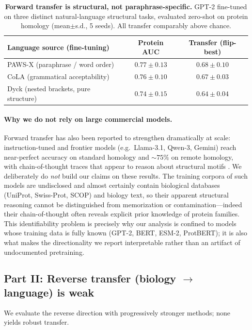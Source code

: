 \documentclass[11pt]{article}
\begin{document}
\begin{table}[t]
\centering
\caption{\textbf{Forward transfer is structural, not paraphrase-specific.} GPT-2 fine-tuned on three
distinct natural-language structural tasks, evaluated zero-shot on protein homology (mean$\pm$s.d.,
5 seeds). All transfer comparably above chance.}
\label{tab:sources}
\begin{tabular}{lcc}
\toprule
Language source (fine-tuning) & Protein AUC & Transfer (flip-best) \\
\midrule
PAWS-X (paraphrase / word order) & $0.77 \pm 0.13$ & $0.68 \pm 0.10$ \\
CoLA (grammatical acceptability) & $0.76 \pm 0.10$ & $0.67 \pm 0.03$ \\
Dyck (nested brackets, pure structure) & $0.74 \pm 0.15$ & $0.64 \pm 0.04$ \\
\bottomrule
\end{tabular}
\end{table}

\paragraph{Why we do not rely on large commercial models.} Forward transfer has also been reported
to strengthen dramatically at scale: instruction-tuned and frontier models (e.g.\ Llama-3.1,
Qwen-3, Gemini) reach near-perfect accuracy on standard homology and $\sim$$75\%$ on remote
homology, with chain-of-thought traces that appear to reason about structural motifs
\cite{wei2022cot,bommasani2021foundation}. We deliberately do \emph{not} build our claims on these
results. The training corpora of such models are undisclosed and almost certainly contain
biological databases (UniProt, Swiss-Prot, SCOP) and biology text, so their apparent structural
reasoning cannot be distinguished from memorization or contamination---indeed their chain-of-thought
often reveals explicit prior knowledge of protein families. This identifiability problem is precisely
why our analysis is confined to models whose training data is fully known (GPT-2, BERT, ESM-2,
ProtBERT); it is also what makes the directionality we report interpretable rather than an artifact
of undocumented pretraining.

\subsection{Part II: Reverse transfer (biology $\rightarrow$ language) is weak}
We evaluate the reverse direction with progressively stronger methods; none yields robust transfer.
\end{document}
